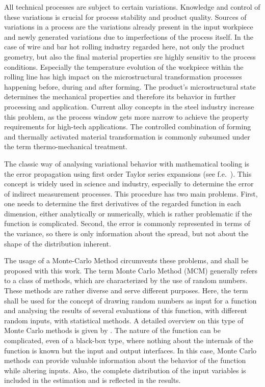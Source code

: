 All technical processes are subject to certain variations.
Knowledge and control of these variations is crucial for process stability and product quality.
Sources of variations in a process are the variations already present in the input workpiece and newly generated variations due to imperfections of the process itself.
In the case of wire and bar hot rolling industry regarded here, not only the product geometry, but also the final material properties sre highly sensitiv to the process conditions.
Especially the temperature evolution of the workpiece within the rolling line has high impact on the microstructural transformation processes happening before, during and after forming.
The product's microstructural state determines the mechanical properties and therefore its behavior in further processing and application.
Current alloy concepts in the steel industry increase this problem, as the process window gets more narrow to achieve the property requirements for high-tech applications.
The controlled combination of forming and thermally activated material transformation is commonly subsumed under the term thermo-mechanical treatment.

The classic way of analysing variational behavior with mathematical tooling is the error propagation using first order Taylor series expansions (see f.e.~\cite{Ku1966}).
This concept is widely used in science and industry, especially to determine the error of indirect measurement processes.
This procedure has two main problems.
First, one needs to determine the first derivatives of the regarded function in each dimension, either analytically or numerically, which is rather problematic if the function is complicated.
Second, the error is commonly represented in terms of the variance, so there is only information about the spread, but not about the shape of the distribution inherent.

The usage of a Monte-Carlo Method circumvents these problems, and shall be proposed with this work.
The term Monte Carlo Method (MCM) generally refers to a class of methods, which are characterized by the use of random numbers.
These methods are rather diverse and serve different purposes.
Here, the term shall be used for the concept of drawing random numbers as input for a function and analysing the results of several evaluations of this function, with different random inputs, with statistical methods.
A detailed overview on this type of Monte Carlo methods is given by \textcite{Lemieux2009}.
The nature of the function can be complicated, even of a black-box type, where nothing about the internals of the function is known but the input and output interfaces.
In this case, Monte Carlo methods can provide valuable information about the behavior of the function while altering inputs.
Also, the complete distribution of the input variables is included in the estimation and is reflected in the results.

